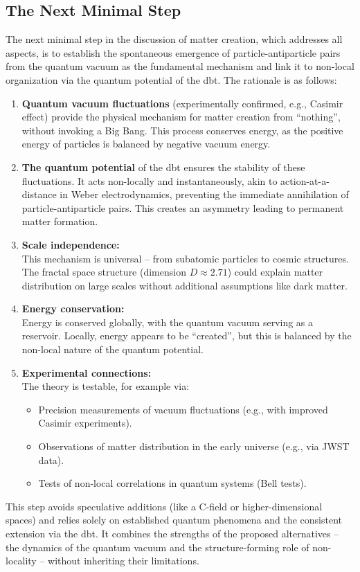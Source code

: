 \subsection{The Next Minimal Step}
The next minimal step in the discussion of matter creation, which addresses all aspects, is to establish the spontaneous emergence of particle-antiparticle pairs from the quantum vacuum as the fundamental mechanism and link it to non-local organization via the quantum potential of the \gls{dbt}. The rationale is as follows:
\begin{enumerate}
    \item \textbf{Quantum vacuum fluctuations} (experimentally confirmed, e.g., Casimir effect) provide the physical mechanism for matter creation from \enquote{nothing}, without invoking a Big Bang. This process conserves energy, as the positive energy of particles is balanced by negative vacuum energy.
    \item \textbf{The quantum potential} of the \gls{dbt} ensures the stability of these fluctuations. It acts non-locally and instantaneously, akin to action-at-a-distance in Weber electrodynamics, preventing the immediate annihilation of particle-antiparticle pairs. This creates an asymmetry leading to permanent matter formation.
    \item \textbf{Scale independence:}\\This mechanism is universal – from subatomic particles to cosmic structures. The fractal space structure (dimension $D \approx 2.71$) could explain matter distribution on large scales without additional assumptions like dark matter.
    \item \textbf{Energy conservation:}\\Energy is conserved globally, with the quantum vacuum serving as a reservoir. Locally, energy appears to be \enquote{created}, but this is balanced by the non-local nature of the quantum potential.
    \item \textbf{Experimental connections:}\\The theory is testable, for example via:
    \begin{itemize}
        \item Precision measurements of vacuum fluctuations (e.g., with improved Casimir experiments).
        \item Observations of matter distribution in the early universe (e.g., via JWST data).
        \item Tests of non-local correlations in quantum systems (Bell tests).
    \end{itemize}
\end{enumerate}
This step avoids speculative additions (like a C-field or higher-dimensional spaces) and relies solely on established quantum phenomena and the consistent extension via the \gls{dbt}. It combines the strengths of the proposed alternatives – the dynamics of the quantum vacuum and the structure-forming role of non-locality – without inheriting their limitations.

